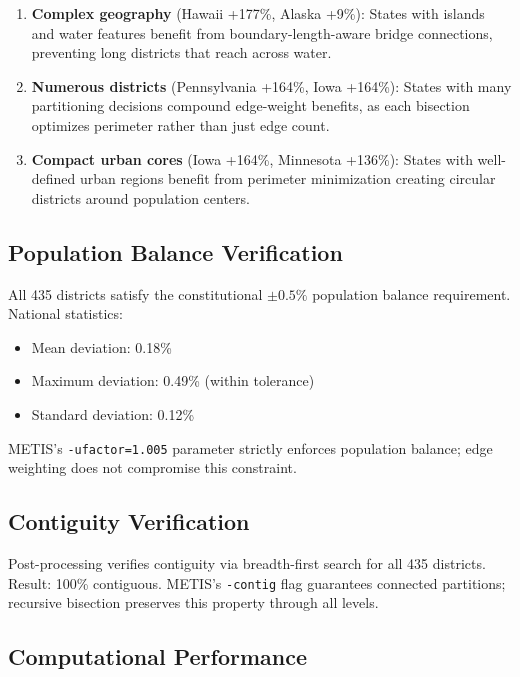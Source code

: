 \begin{enumerate}
    \item \textbf{Complex geography} (Hawaii +177\%, Alaska +9\%): States with islands and water features benefit from boundary-length-aware bridge connections, preventing long districts that reach across water.

    \item \textbf{Numerous districts} (Pennsylvania +164\%, Iowa +164\%): States with many partitioning decisions compound edge-weight benefits, as each bisection optimizes perimeter rather than just edge count.

    \item \textbf{Compact urban cores} (Iowa +164\%, Minnesota +136\%): States with well-defined urban regions benefit from perimeter minimization creating circular districts around population centers.
\end{enumerate}

\subsection{Population Balance Verification}

All 435 districts satisfy the constitutional $\pm 0.5\%$ population balance requirement. National statistics:
\begin{itemize}
    \item Mean deviation: 0.18\%
    \item Maximum deviation: 0.49\% (within tolerance)
    \item Standard deviation: 0.12\%
\end{itemize}

METIS's \texttt{-ufactor=1.005} parameter strictly enforces population balance; edge weighting does not compromise this constraint.

\subsection{Contiguity Verification}

Post-processing verifies contiguity via breadth-first search for all 435 districts. Result: 100\% contiguous. METIS's \texttt{-contig} flag guarantees connected partitions; recursive bisection preserves this property through all levels.

\subsection{Computational Performance}

